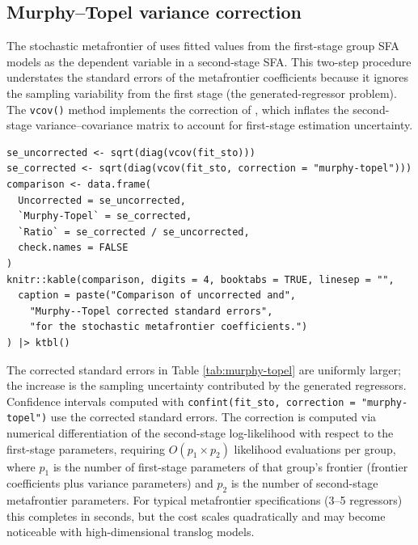 \subsection{Murphy--Topel variance correction}\label{sec:murphy-topel}

The stochastic metafrontier of \citet{huang2014} uses fitted values from the
first-stage group SFA models as the dependent variable in a second-stage SFA.
This two-step procedure understates the standard errors of the metafrontier
coefficients because it ignores the sampling variability from the first
stage (the generated-regressor problem). The \texttt{vcov()} method implements the
correction of \citet{murphy1985}, which inflates the second-stage
variance--covariance matrix to account for first-stage estimation
uncertainty.

\begin{verbatim}
se_uncorrected <- sqrt(diag(vcov(fit_sto)))
se_corrected <- sqrt(diag(vcov(fit_sto, correction = "murphy-topel")))
comparison <- data.frame(
  Uncorrected = se_uncorrected,
  `Murphy-Topel` = se_corrected,
  `Ratio` = se_corrected / se_uncorrected,
  check.names = FALSE
)
knitr::kable(comparison, digits = 4, booktabs = TRUE, linesep = "",
  caption = paste("Comparison of uncorrected and",
    "Murphy--Topel corrected standard errors",
    "for the stochastic metafrontier coefficients.")
) |> ktbl()
\end{verbatim}

\begin{table}
\centering
\caption{\label{tab:murphy-topel}Comparison of uncorrected and Murphy--Topel corrected standard errors for the stochastic metafrontier coefficients.}
\centering
{}
\end{table}

The corrected standard errors in Table \ref{tab:murphy-topel} are
uniformly larger; the increase is the sampling uncertainty contributed by
the generated regressors. Confidence intervals computed with
\texttt{confint(fit\_sto,\ correction\ =\ "murphy-topel")} use the corrected standard
errors. The correction is computed via numerical differentiation of the
second-stage log-likelihood with respect to the first-stage parameters,
requiring \(O(p_1 \times p_2)\) likelihood evaluations per group, where
\(p_1\) is the number of first-stage parameters of that group's frontier
(frontier coefficients plus variance parameters) and \(p_2\) is the number
of second-stage metafrontier parameters. For typical metafrontier
specifications (3--5 regressors) this completes in seconds, but the cost
scales quadratically and may become noticeable with high-dimensional
translog models.

